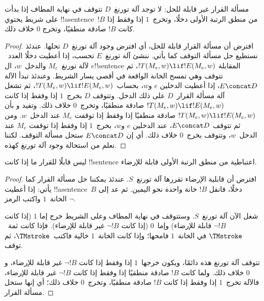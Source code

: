 \documentclass[../../../include/open-logic-section]{subfiles}
\begin{document}

\begin{thm}
مسألة القرار غير قابلة للحل: لا توجد آلة تورنغ~$D$ تتوقف في نهاية
المطاف إذا بدأت على شريط يحتوي !!a{sentence}~$!B$ من منطق الرتبة
الأولى دخلًا، وتخرج~$1$ إذا وفقط إذا كانت $!B$ صادقة منطقيًا، وتخرج
$0$ خلاف ذلك.
\end{thm}

\begin{proof}
افترض أن مسألة القرار قابلة للحل، أي افترض وجود آلة تورنغ~$D$ تحلها.
عندئذ نستطيع حل مسألة التوقف كما يأتي. ننشئ آلة تورنغ~$E$ تحسب، إذا
أعطيت دخلًا العدد~$e$ لآلة تورنغ~$M_e$ والدخل~$w$، ال!!{sentence}
المقابلة $!T(M_e,w)\lif !E(M_e,w)$، ثم تتوقف وهي تمسح الخانة الواقعة
في أقصى يسار الشريط. وعندئذ تبدأ الآلة $E\concat D$، إذا أعطيت
الدخلين $e$ و$w$، بحساب~$!T(M_e,w)\lif !E(M_e,w)$، ثم تشغل آلة
مسألة القرار~$D$ على ذلك الدخل. وتتوقف $D$ بخرج~$1$ إذا وفقط إذا
كانت $!T(M_e,w)\lif !E(M_e,w)$ صادقة منطقيًا، وتخرج~$0$ خلاف ذلك.
وتفيد  و
 بأن $!T(M_e,w)\lif !E(M_e,w)$ صادقة
منطقيًا إذا وفقط إذا توقفت $M_e$ عند الدخل~$w$. ومن ثم تتوقف
$E\concat D$، عند الدخلين $e$ و$w$، بخرج~$1$ إذا وفقط إذا توقفت
$M_e$ عند الدخل~$w$، وتتوقف بخرج~$0$ خلاف ذلك. أي إن
$E\concat D$ ستحل مسألة التوقف. لكننا نعلم من
 استحالة وجود آلة تورنغ كهذه.
\end{proof}

\begin{cor}%
ليس قابلًا للقرار ما إذا كانت !!{sentence} اعتباطية من منطق الرتبة
الأولى قابلة للإرضاء.
\end{cor}

\begin{proof}
  افترض أن قابلية الإرضاء تقررها آلة تورنغ~$S$. عندئذ يمكننا حل
  مسألة القرار كما يأتي: إذا أعطيت !!a{sentence}~$B$ دخلًا، فانقل
  $!B$ خانة واحدة نحو اليمين. ثم عد إلى الخانة~$1$ واكتب الرمز
  $\lnot$.

  شغل الآن آلة تورنغ~$S$. وستتوقف في نهاية المطاف وعلى الشريط خرج
  إما $1$ (إذا كانت $\lnot !B$ قابلة للإرضاء) وإما~$0$ (إذا كانت
  $\lnot !B$ غير قابلة للإرضاء). فإذا كانت ثمة~$\TMstroke$ في
  الخانة~$1$ فامحها؛ وإذا كانت الخانة~$1$ خالية فاكتب~$\TMstroke$،
  ثم توقف.

  تتوقف آلة تورنغ هذه دائمًا، ويكون خرجها~$1$ إذا وفقط إذا كانت
  $\lnot !B$ غير قابلة للإرضاء، و$0$ خلاف ذلك. ولما كانت $!B$ صادقة
  منطقيًا إذا وفقط إذا كانت $\lnot !B$ غير قابلة للإرضاء، فالآلة
  تخرج~$1$ إذا وفقط إذا كانت $!B$ صادقة منطقيًا، وتخرج~$0$ خلاف
  ذلك؛ أي إنها ستحل مسألة القرار.
\end{proof}
\end{document}
